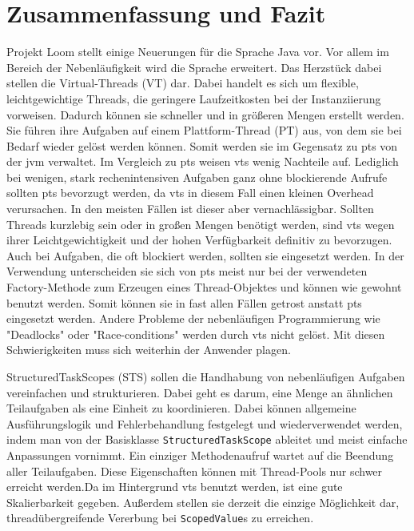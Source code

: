 \chapter{Zusammenfassung und Fazit}
\label{cha:fazit}
    Projekt Loom stellt einige Neuerungen für die Sprache Java vor. Vor allem im Bereich der Nebenläufigkeit wird die Sprache erweitert. Das Herzstück dabei stellen die Virtual-Threads (VT) dar.
    Dabei handelt es sich um flexible, leichtgewichtige Threads, die geringere Laufzeitkosten bei der Instanziierung vorweisen. Dadurch können sie schneller und in größeren Mengen erstellt werden.
    Sie führen ihre Aufgaben auf einem Plattform-Thread (PT) aus, von dem sie bei Bedarf wieder gelöst werden können. Somit werden sie im Gegensatz zu \Glspl{pt} von der \gls{jvm} verwaltet.
    Im Vergleich zu \Glspl{pt} weisen \Glspl{vt} wenig Nachteile auf. Lediglich bei wenigen, stark rechenintensiven Aufgaben ganz ohne blockierende Aufrufe sollten \Glspl{pt} bevorzugt werden, da \Glspl{vt}
    in diesem Fall einen kleinen Overhead verursachen. In den meisten Fällen ist dieser aber vernachlässigbar. Sollten Threads kurzlebig sein oder in großen Mengen benötigt werden, sind \Glspl{vt}
    wegen ihrer Leichtgewichtigkeit und der hohen Verfügbarkeit definitiv
    zu bevorzugen. Auch bei Aufgaben, die oft blockiert werden, sollten sie eingesetzt werden. In der Verwendung unterscheiden sie sich von \Glspl{pt} 
    meist nur bei der verwendeten Factory-Methode zum Erzeugen eines Thread-Objektes und können wie gewohnt benutzt werden.
    Somit können sie in fast allen Fällen getrost anstatt \Glspl{pt} eingesetzt werden. Andere Probleme der nebenläufigen Programmierung wie "Deadlocks" oder "Race-conditions" werden durch \Glspl{vt} nicht gelöst.
    Mit diesen Schwierigkeiten muss sich weiterhin der Anwender plagen.

    StructuredTaskScopes (STS) sollen die Handhabung von nebenläufigen Aufgaben vereinfachen und strukturieren. Dabei geht es darum, eine Menge an ähnlichen Teilaufgaben als eine Einheit zu koordinieren. Dabei können allgemeine
    Ausführungslogik und Fehlerbehandlung festgelegt und wiederverwendet werden, indem man von der Basisklasse \texttt{StructuredTaskScope} ableitet und meist einfache Anpassungen vornimmt. Ein einziger Methodenaufruf wartet auf
    die Beendung aller Teilaufgaben.
    Diese Eigenschaften können mit Thread-Pools nur
    schwer erreicht werden.Da im Hintergrund \Glspl{vt} benutzt werden,
    ist eine gute Skalierbarkeit gegeben. Außerdem stellen sie derzeit die einzige Möglichkeit dar, threadübergreifende Vererbung bei \texttt{ScopedValue}s zu erreichen.

